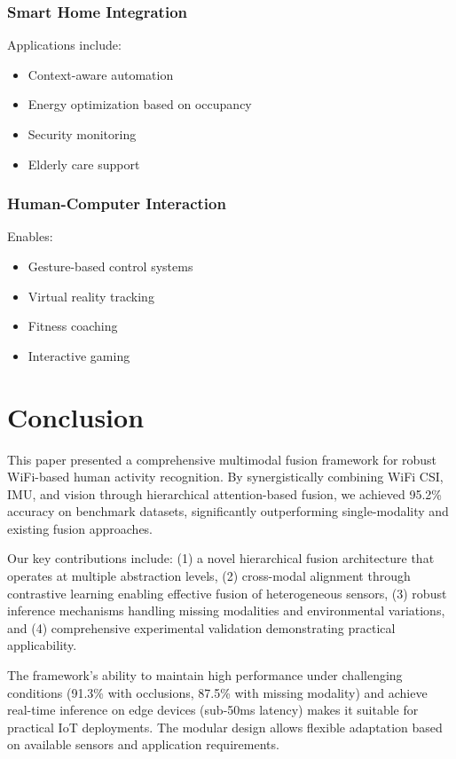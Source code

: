 \documentclass[journal]{IEEEtran}
\begin{document}
\subsubsection{Smart Home Integration}

Applications include:
\begin{itemize}
\item Context-aware automation
\item Energy optimization based on occupancy
\item Security monitoring
\item Elderly care support
\end{itemize}

\subsubsection{Human-Computer Interaction}

Enables:
\begin{itemize}
\item Gesture-based control systems
\item Virtual reality tracking
\item Fitness coaching
\item Interactive gaming
\end{itemize}

\section{Conclusion}

This paper presented a comprehensive multimodal fusion framework for robust WiFi-based human activity recognition. By synergistically combining WiFi CSI, IMU, and vision through hierarchical attention-based fusion, we achieved 95.2\% accuracy on benchmark datasets, significantly outperforming single-modality and existing fusion approaches.

Our key contributions include: (1) a novel hierarchical fusion architecture that operates at multiple abstraction levels, (2) cross-modal alignment through contrastive learning enabling effective fusion of heterogeneous sensors, (3) robust inference mechanisms handling missing modalities and environmental variations, and (4) comprehensive experimental validation demonstrating practical applicability.

The framework's ability to maintain high performance under challenging conditions (91.3\% with occlusions, 87.5\% with missing modality) and achieve real-time inference on edge devices (sub-50ms latency) makes it suitable for practical IoT deployments. The modular design allows flexible adaptation based on available sensors and application requirements.
\end{document}
